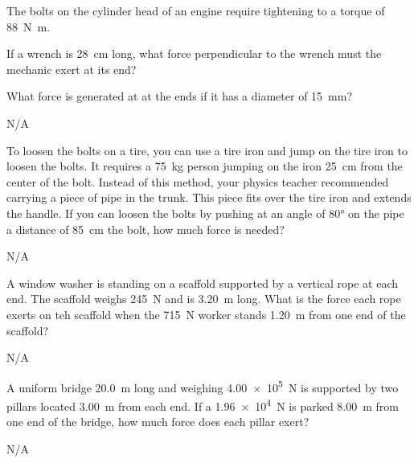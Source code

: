 \begin{question}[ID=torque-B-Q02,topic=torque,difficulty=B]
    The bolts on the cylinder head of an engine require tightening to
        a torque of \SI{88}{\newton\meter}.
    \begin{enumerate*}[label=\arabic*)]
        \item If a wrench is \SI{28}{\centi\meter} long, what
            force perpendicular to the wrench must the mechanic
            exert at its end?
        \item What force is generated at at the ends if it has
            a diameter of \SI{15}{\milli\meter}?
    \end{enumerate*}
\end{question}
\begin{solution}
    N/A
\end{solution}


\begin{question}[ID=torque-B-Q03,topic=torque,difficulty=B]
    To loosen the bolts on a tire, you can use a tire iron
        and jump on the tire iron to loosen the bolts.
    It requires a \SI{75}{\kilo\gram} person jumping on the
        iron \SI{25}{\centi\meter} from the center of the bolt.
    Instead of this method, your physics teacher recommended carrying
        a piece of pipe in the trunk.
    This piece fits over the tire iron and extends the handle.
    If you can loosen the bolts by pushing at an angle of \ang{80}
        on the pipe a distance of \SI{85}{\centi\meter} the bolt,
        how much force is needed?
\end{question}
\begin{solution}
    N/A
\end{solution}


\begin{question}[ID=torque-B-Q04,topic=torque,difficulty=B]
    A window washer is standing on a scaffold supported by a vertical
        rope at each end.
    The scaffold weighs \SI{245}{\newton} and is \SI{3.20}{\meter} long.
    What is the force each rope exerts on teh scaffold when the
        \SI{715}{\newton} worker stands \SI{1.20}{\meter} from
        one end of the scaffold?
\end{question}
\begin{solution}
    N/A
\end{solution}


\begin{question}[ID=torque-B-Q05,topic=torque,difficulty=B]
    A uniform bridge \SI{20.0}{\meter} long and weighing \SI{4.00e5}{\newton}
        is supported by two pillars located \SI{3.00}{\meter} from each end.
    If a \SI{1.96e4}{\newton} is parked \SI{8.00}{\meter} from one end of
        the bridge, how much force does each pillar exert?
\end{question}
\begin{solution}
    N/A
\end{solution}


